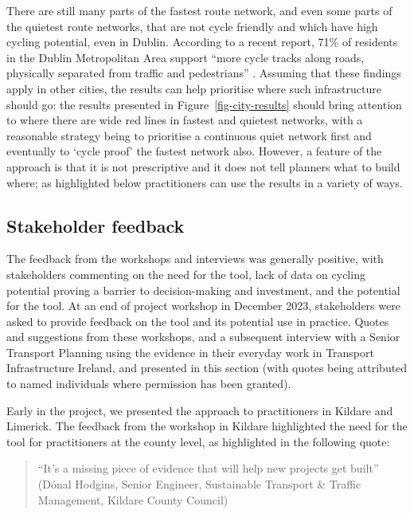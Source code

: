 \documentclass[
  super,
  preprint,
  3p]{elsarticle}
\begin{document}
There are still many parts of the fastest route network, and even some
parts of the quietest route networks, that are not cycle friendly and
which have high cycling potential, even in Dublin. According to a recent
report, 71\% of residents in the Dublin Metropolitan Area support ``more
cycle tracks along roads, physically separated from traffic and
pedestrians'' \citep{walking2021}. Assuming that these findings apply in
other cities, the results can help prioritise where such infrastructure
should go: the results presented in Figure~\ref{fig-city-results} should
bring attention to where there are wide red lines in fastest and
quietest networks, with a reasonable strategy being to prioritise a
continuous quiet network first and eventually to `cycle proof' the
fastest network also. However, a feature of the approach is that it is
not prescriptive and it does not tell planners what to build where; as
highlighted below practitioners can use the results in a variety of
ways.

\subsection{Stakeholder feedback}\label{sec-qualitative}

The feedback from the workshops and interviews was generally positive,
with stakeholders commenting on the need for the tool, lack of data on
cycling potential proving a barrier to decision-making and investment,
and the potential for the tool. At an end of project workshop in
December 2023, stakeholders were asked to provide feedback on the tool
and its potential use in practice. Quotes and suggestions from these
workshops, and a subsequent interview with a Senior Transport Planning
using the evidence in their everyday work in Transport Infrastructure
Ireland, and presented in this section (with quotes being attributed to
named individuals where permission has been granted).

Early in the project, we presented the approach to practitioners in
Kildare and Limerick. The feedback from the workshop in Kildare
highlighted the need for the tool for practitioners at the county level,
as highlighted in the following quote:

\begin{quote}
``It's a missing piece of evidence that will help new projects get
built'' (Dónal Hodgins, Senior Engineer, Sustainable Transport \&
Traffic Management, Kildare County Council)
\end{quote}
\end{document}
